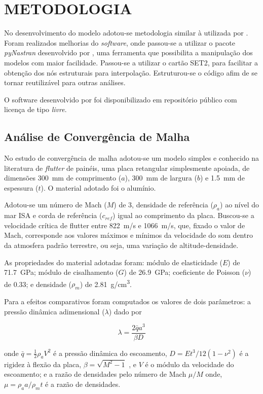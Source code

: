 \section{METODOLOGIA}

No desenvolvimento do modelo adotou-se metodologia similar à utilizada
por \cite{santos_finite_2019}. Foram realizados melhorias do 
\emph{software}, onde passou-se a utilizar o pacote \emph{pyNastran} desenvolvido por \cite{doyle_stevedoyle2pynastran_2020},
uma ferramenta que possibilita a manipulação dos modelos com maior
facilidade. Passou-se a utilizar o cartão SET2, para facilitar a obtenção dos nós estruturais para interpolação. Estruturou-se o código afim de se tornar reutilizável para outras análises.

O software desenvolvido por \cite{santos_zuckberjnastran-aero-flutter_2020}
foi disponibilizado em repositório público com licença de tipo \emph{livre}.


\subsection{Análise de Convergência de Malha}

No estudo de convergência de malha adotou-se um modelo simples e conhecido na literatura de \emph{flutter} de painéis, uma placa retangular simplesmente apoiada, de dimensões \SI{300}{mm} de comprimento ($a$), 
\SI{300}{mm} de largura ($b$) e \SI{1.5}{mm} de espessura ($t$). O material adotado foi o alumínio.

Adotou-se um número de Mach ($M$) de \num{3}, densidade de referência ($\rho_a$) ao nível do mar ISA e corda de referência ($c_{ref}$) igual ao comprimento da placa.
Buscou-se a velocidade crítica de flutter entre \SI{822}{m/s} e \SI{1066}{m/s}, que, fixado o valor de Mach, corresponde aos valores máximos e mínimos da velocidade do som dentro da atmosfera padrão terrestre, ou seja, uma variação de altitude-densidade.

As propriedades do material adotadas foram: módulo de elasticidade ($E$) de \SI{71.7}{GPa}; módulo de cisalhamento ($G$) de \SI{26,9}{GPa}; coeficiente de Poisson ($\nu$) de \num{0,33}; e densidade ($\rho_m$) de \SI{2.81}{g/cm^3}.

Para a efeitos comparativos foram computados os valores de dois parâmetros: a pressão dinâmica adimensional ($\lambda$) dado por 

$$\lambda = \frac{2 \bar{q} a^3 }{\beta D}$$

onde
$\bar{q} = \frac{1}{2} \rho_a V^2$
é a pressão dinâmica do escoamento,
$D = E t^3/12(1 - \nu^2)$
é a rigidez à flexão da placa,
$\beta = \sqrt{M^2 - 1}$
, e $V$ é o módulo da velocidade do escoamento;
e a razão de densidades pelo número de Mach $\mu / M$ onde,
$\mu = \rho_a a/\rho_m t$ é a razão de densidades.

